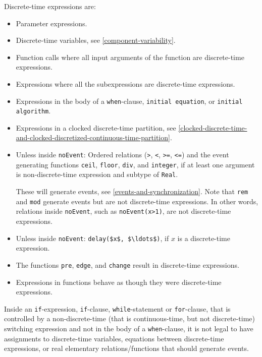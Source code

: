 Discrete-time expressions are:
\begin{itemize}
\item
  Parameter expressions.
\item
  Discrete-time variables, see \cref{component-variability}.
\item
  Function calls where all input arguments of the function are discrete-time expressions.
\item
  Expressions where all the subexpressions are discrete-time expressions.
\item
  Expressions in the body of a \lstinline!when!-clause, \lstinline!initial equation!, or \lstinline!initial algorithm!.
\item
  Expressions in a clocked discrete-time partition, see \cref{clocked-discrete-time-and-clocked-discretized-continuous-time-partition}.
\item
  Unless inside \lstinline!noEvent!: Ordered relations (\lstinline!>!, \lstinline!<!, \lstinline!>=!, \lstinline!<=!) and the event generating functions \lstinline!ceil!, \lstinline!floor!, \lstinline!div!, and \lstinline!integer!, if at least one argument is non-discrete-time expression and subtype of \lstinline!Real!.
  \begin{nonnormative}
  These will generate events, see \cref{events-and-synchronization}.
  Note that \lstinline!rem! and \lstinline!mod! generate events but are not discrete-time expressions.
  In other words, relations inside \lstinline!noEvent!, such as \lstinline!noEvent(x>1)!, are not discrete-time expressions.
  \end{nonnormative}
\item
  Unless inside \lstinline!noEvent!: \lstinline!delay($x$, $\ldots$)!, if $x$ is a discrete-time expression.
\item
  The functions \lstinline!pre!, \lstinline!edge!, and \lstinline!change! result in discrete-time expressions.
\item
  Expressions in functions behave as though they were discrete-time expressions.
\end{itemize}

Inside an \lstinline!if!-expression, \lstinline!if!-clause, \lstinline!while!-statement or \lstinline!for!-clause, that is controlled by a non-discrete-time (that is continuous-time, but not discrete-time) switching expression and not in the body of a \lstinline!when!-clause, it is not legal to have assignments to discrete-time variables, equations between discrete-time expressions, or real elementary relations/functions that should generate events.

